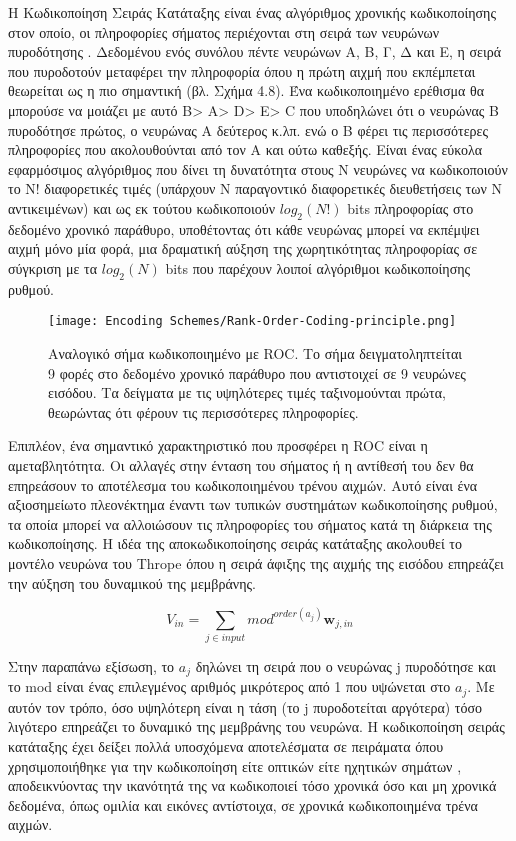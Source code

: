 \documentclass[12pt]{report}
\begin{document}
Η Κωδικοποίηση Σειράς Κατάταξης είναι ένας αλγόριθμος χρονικής κωδικοποίησης στον οποίο, οι πληροφορίες σήματος περιέχονται στη σειρά των νευρώνων πυροδότησης \cite{Thorpe1998}. Δεδομένου ενός συνόλου πέντε νευρώνων Α, Β, Γ, Δ και Ε, η σειρά που πυροδοτούν μεταφέρει την πληροφορία όπου η πρώτη αιχμή που εκπέμπεται θεωρείται ως η πιο σημαντική (βλ. Σχήμα 4.8). Ένα κωδικοποιημένο ερέθισμα θα μπορούσε να μοιάζει με αυτό B> A> D> E> C που υποδηλώνει ότι ο νευρώνας Β πυροδότησε πρώτος, ο νευρώνας Α δεύτερος κ.λπ. ενώ ο Β φέρει τις περισσότερες πληροφορίες που ακολουθούνται από τον Α και ούτω καθεξής. Είναι ένας εύκολα εφαρμόσιμος αλγόριθμος που δίνει τη δυνατότητα στους Ν νευρώνες να κωδικοποιούν το Ν! διαφορετικές τιμές (υπάρχουν N παραγοντικό διαφορετικές διευθετήσεις των N αντικειμένων) και ως εκ τούτου κωδικοποιούν \(log_2(N!)\) \textlatin{bits} πληροφορίας στο δεδομένο χρονικό παράθυρο, υποθέτοντας ότι κάθε νευρώνας μπορεί να εκπέμψει αιχμή μόνο μία φορά, μια δραματική αύξηση της χωρητικότητας πληροφορίας σε σύγκριση με τα \(log_2(N)\) \textlatin{bits} που παρέχουν λοιποί αλγόριθμοι κωδικοποίησης ρυθμού.

\begin{figure}[htp]
    \centering
    \texttt{[image: Encoding Schemes/Rank-Order-Coding-principle.png]}
    \caption{Αναλογικό σήμα κωδικοποιημένο με \textlatin{ROC}. Το σήμα δειγματοληπτείται 9 φορές στο δεδομένο χρονικό παράθυρο που αντιστοιχεί σε 9 νευρώνες εισόδου. Τα δείγματα με τις υψηλότερες τιμές ταξινομούνται πρώτα, θεωρώντας ότι φέρουν τις περισσότερες πληροφορίες.}
    \label{fig:spikeprop-net-architecture}
\end{figure}

Επιπλέον, ένα σημαντικό χαρακτηριστικό που προσφέρει η \textlatin{ROC} είναι η αμεταβλητότητα. Οι αλλαγές στην ένταση του σήματος ή η αντίθεσή του δεν θα επηρεάσουν το αποτέλεσμα του κωδικοποιημένου τρένου αιχμών. Αυτό είναι ένα αξιοσημείωτο πλεονέκτημα έναντι των τυπικών συστημάτων κωδικοποίησης ρυθμού, τα οποία μπορεί να αλλοιώσουν τις πληροφορίες του σήματος κατά τη διάρκεια της κωδικοποίησης. Η ιδέα της αποκωδικοποίησης σειράς κατάταξης ακολουθεί το μοντέλο νευρώνα του \textlatin{Thrope} όπου η σειρά άφιξης της αιχμής της εισόδου επηρεάζει την αύξηση του δυναμικού της μεμβράνης.

\[V_{in} = \sum_{j\in input}mod^{order(a_j)}\pmb{w}_{j,in}\] 

Στην παραπάνω εξίσωση, το \(a_j\) δηλώνει τη σειρά που ο νευρώνας \textlatin{j} πυροδότησε και το \textlatin{mod} είναι ένας επιλεγμένος αριθμός μικρότερος από 1 που υψώνεται στο \(a_j\). Με αυτόν τον τρόπο, όσο υψηλότερη είναι η τάση (το \textlatin{j} πυροδοτείται αργότερα) τόσο λιγότερο επηρεάζει το δυναμικό της μεμβράνης του νευρώνα. Η κωδικοποίηση σειράς κατάταξης έχει δείξει πολλά υποσχόμενα αποτελέσματα σε πειράματα όπου χρησιμοποιήθηκε για την κωδικοποίηση είτε οπτικών \cite{Delorme2001} είτε ηχητικών σημάτων \cite{Loiselle2006}, αποδεικνύοντας την ικανότητά της να κωδικοποιεί τόσο χρονικά όσο και μη χρονικά δεδομένα, όπως ομιλία και εικόνες αντίστοιχα, σε χρονικά κωδικοποιημένα τρένα αιχμών.
\end{document}
